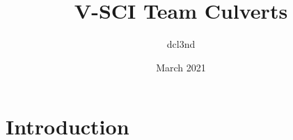 \documentclass{article}
\title{V-SCI Team Culverts}
\author{dcl3nd }
\date{March 2021}
\begin{document}
\maketitle

\section{Introduction}
\end{document}
